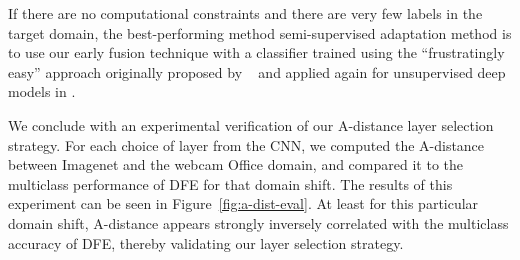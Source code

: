 If there are no computational constraints and there are very few labels in
the target domain, the best-performing method semi-supervised adaptation method is to use our early fusion technique with a classifier trained using the ``frustratingly easy'' approach originally proposed by \daume~\cite{daume} and applied again for
unsupervised deep models in \cite{ref:dlid}.

We conclude with an experimental verification of our A-distance layer selection strategy.
For each choice of layer from the CNN, we computed the A-distance between Imagenet and the webcam Office domain, and compared it to the multiclass performance of DFE for that domain shift.
The results of this experiment can be seen in Figure~\ref{fig:a-dist-eval}.
At least for this particular domain shift, A-distance appears strongly inversely correlated with the multiclass accuracy of DFE, thereby validating our layer selection strategy.
